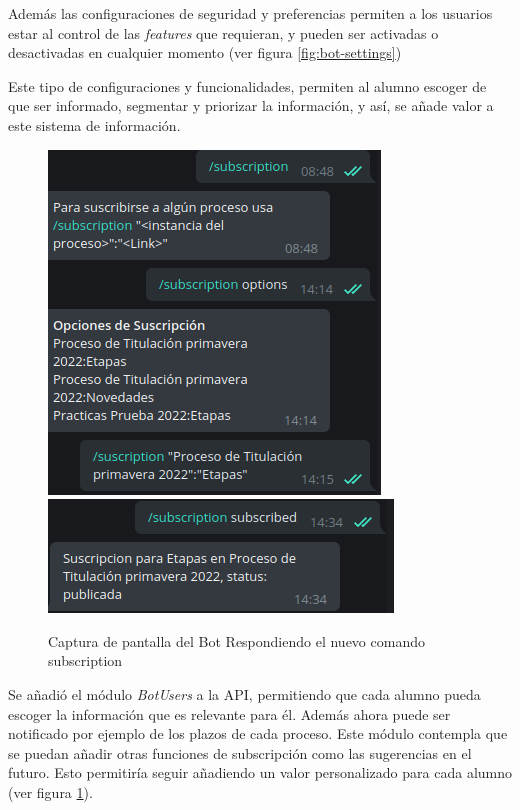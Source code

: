     \par Además las configuraciones de seguridad y preferencias permiten a los usuarios estar al control de las \textit{features} que requieran, y pueden ser activadas o desactivadas en cualquier momento (ver figura \ref{fig:bot-settings})
    \par Este tipo de configuraciones y funcionalidades, permiten al alumno escoger de que ser informado, segmentar y priorizar la información, y así, se añade valor a este sistema de información.

    \begin{figure}[h!]
        \centering
        \includegraphics[scale=0.5]{media/imagenes/sc/subscription.png}
        \includegraphics[scale=0.5]{media/imagenes/sc/suscription1.png}
        \caption[Bot subscription]{Captura de pantalla del Bot Respondiendo el nuevo comando subscription}
        \label{fig:bot-sus}
    \end{figure}
    
    \par Se añadió el módulo \textit{BotUsers} a la API, permitiendo que cada alumno pueda escoger la información que es relevante para él. Además ahora puede ser notificado por ejemplo de los plazos de cada proceso. Este módulo contempla que se puedan añadir otras funciones de subscripción como las sugerencias en el futuro. Esto permitiría seguir añadiendo un valor personalizado para cada alumno (ver figura \ref{fig:bot-sus}).

